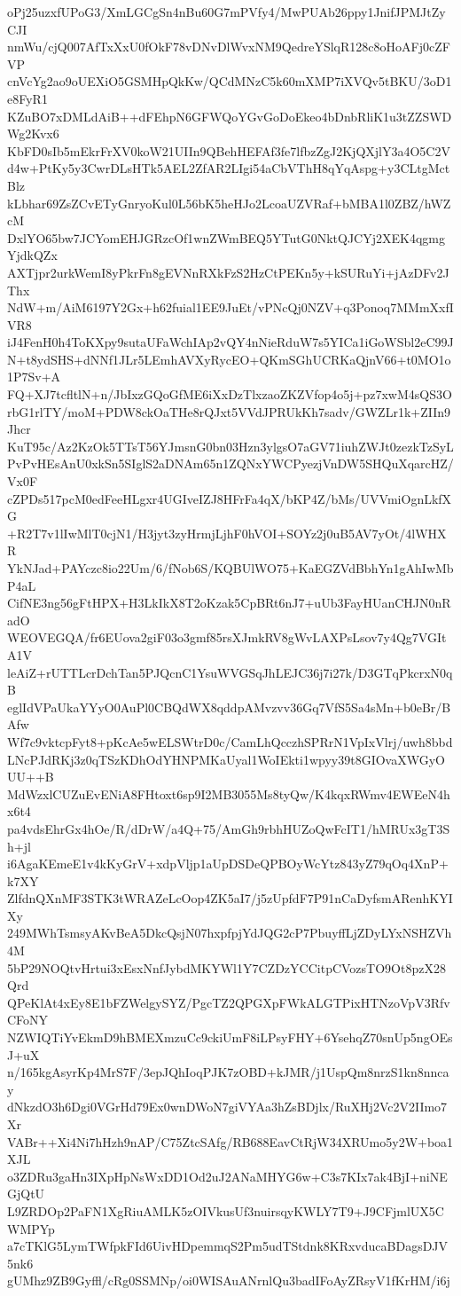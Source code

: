 oPj25uzxfUPoG3/XmLGCgSn4nBu60G7mPVfy4/MwPUAb26ppy1JnifJPMJtZyCJI
nmWu/cjQ007AfTxXxU0fOkF78vDNvDlWvxNM9QedreYSlqR128c8oHoAFj0cZFVP
cnVcYg2ao9oUEXiO5GSMHpQkKw/QCdMNzC5k60mXMP7iXVQv5tBKU/3oD1e8FyR1
KZuBO7xDMLdAiB++dFEhpN6GFWQoYGvGoDoEkeo4bDnbRliK1u3tZZSWDWg2Kvx6
KbFD0sIb5mEkrFrXV0koW21UIIn9QBehHEFAf3fe7lfbzZgJ2KjQXjlY3a4O5C2V
d4w+PtKy5y3CwrDLsHTk5AEL2ZfAR2LIgi54aCbVThH8qYqAspg+y3CLtgMctBlz
kLbhar69ZsZCvETyGnryoKul0L56bK5heHJo2LcoaUZVRaf+bMBA1l0ZBZ/hWZcM
DxlYO65bw7JCYomEHJGRzcOf1wnZWmBEQ5YTutG0NktQJCYj2XEK4qgmgYjdkQZx
AXTjpr2urkWemI8yPkrFn8gEVNnRXkFzS2HzCtPEKn5y+kSURuYi+jAzDFv2JThx
NdW+m/AiM6197Y2Gx+h62fuial1EE9JuEt/vPNcQj0NZV+q3Ponoq7MMmXxfIVR8
iJ4FenH0h4ToKXpy9sutaUFaWchIAp2vQY4nNieRduW7s5YICa1iGoWSbl2eC99J
N+t8ydSHS+dNNf1JLr5LEmhAVXyRycEO+QKmSGhUCRKaQjnV66+t0MO1o1P7Sv+A
FQ+XJ7tcfltlN+n/JbIxzGQoGfME6iXxDzTlxzaoZKZVfop4o5j+pz7xwM4sQS3O
rbG1rlTY/moM+PDW8ckOaTHe8rQJxt5VVdJPRUkKh7sadv/GWZLr1k+ZIIn9Jhcr
KuT95c/Az2KzOk5TTsT56YJmsnG0bn03Hzn3ylgsO7aGV71iuhZWJt0zezkTzSyL
PvPvHEsAnU0xkSn5SIglS2aDNAm65n1ZQNxYWCPyezjVnDW5SHQuXqarcHZ/Vx0F
cZPDs517pcM0edFeeHLgxr4UGIveIZJ8HFrFa4qX/bKP4Z/bMs/UVVmiOgnLkfXG
+R2T7v1lIwMlT0cjN1/H3jyt3zyHrmjLjhF0hVOI+SOYz2j0uB5AV7yOt/4lWHXR
YkNJad+PAYczc8io22Um/6/fNob6S/KQBUlWO75+KaEGZVdBbhYn1gAhIwMbP4aL
CifNE3ng56gFtHPX+H3LkIkX8T2oKzak5CpBRt6nJ7+uUb3FayHUanCHJN0nRadO
WEOVEGQA/fr6EUova2giF03o3gmf85rsXJmkRV8gWvLAXPsLsov7y4Qg7VGItA1V
leAiZ+rUTTLcrDchTan5PJQcnC1YsuWVGSqJhLEJC36j7i27k/D3GTqPkcrxN0qB
eglIdVPaUkaYYyO0AuPl0CBQdWX8qddpAMvzvv36Gq7VfS5Sa4sMn+b0eBr/BAfw
Wf7c9vktcpFyt8+pKcAe5wELSWtrD0c/CamLhQcczhSPRrN1VpIxVlrj/uwh8bbd
LNcPJdRKj3z0qTSzKDhOdYHNPMKaUyal1WoIEkti1wpyy39t8GIOvaXWGyOUU++B
MdWzxlCUZuEvENiA8FHtoxt6sp9I2MB3055Ms8tyQw/K4kqxRWmv4EWEeN4hx6t4
pa4vdsEhrGx4hOe/R/dDrW/a4Q+75/AmGh9rbhHUZoQwFcIT1/hMRUx3gT3Sh+jl
i6AgaKEmeE1v4kKyGrV+xdpVljp1aUpDSDeQPBOyWcYtz843yZ79qOq4XnP+k7XY
ZlfdnQXnMF3STK3tWRAZeLcOop4ZK5aI7/j5zUpfdF7P91nCaDyfsmARenhKYIXy
249MWhTsmsyAKvBeA5DkcQsjN07hxpfpjYdJQG2cP7PbuyffLjZDyLYxNSHZVh4M
5bP29NOQtvHrtui3xEsxNnfJybdMKYWl1Y7CZDzYCCitpCVozsTO9Ot8pzX28Qrd
QPeKlAt4xEy8E1bFZWelgySYZ/PgcTZ2QPGXpFWkALGTPixHTNzoVpV3RfvCFoNY
NZWIQTiYvEkmD9hBMEXmzuCc9ckiUmF8iLPsyFHY+6YsehqZ70snUp5ngOEsJ+uX
n/165kgAsyrKp4MrS7F/3epJQhIoqPJK7zOBD+kJMR/j1UspQm8nrzS1kn8nncay
dNkzdO3h6Dgi0VGrHd79Ex0wnDWoN7giVYAa3hZsBDjlx/RuXHj2Vc2V2IImo7Xr
VABr++Xi4Ni7hHzh9nAP/C75ZtcSAfg/RB688EavCtRjW34XRUmo5y2W+boa1XJL
o3ZDRu3gaHn3IXpHpNsWxDD1Od2uJ2ANaMHYG6w+C3s7KIx7ak4BjI+niNEGjQtU
L9ZRDOp2PaFN1XgRiuAMLK5zOIVkusUf3nuirsqyKWLY7T9+J9CFjmlUX5CWMPYp
a7cTKlG5LymTWfpkFId6UivHDpemmqS2Pm5udTStdnk8KRxvducaBDagsDJV5nk6
gUMhz9ZB9Gyffl/cRg0SSMNp/oi0WISAuANrnlQu3badIFoAyZRsyV1fKrHM/i6j
